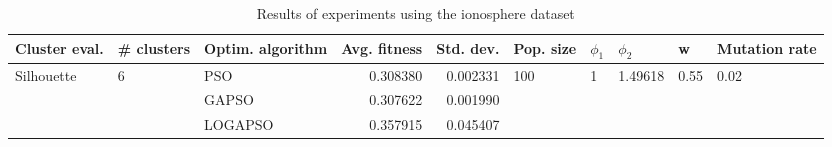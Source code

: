 \begin{table}
\centering
\caption{Results of experiments using the ionosphere dataset}
\begin{tabular}{lllrrlllll}
\toprule
              Cluster eval. &        \# clusters & Optim. algorithm &  Avg. fitness &  Std. dev. &            Pop. size &         $\phi_{1}$ &               $\phi_{2}$ &                     w &         Mutation rate \\
\midrule
\multirow{3}{*}{Silhouette} & \multirow{3}{*}{6} &              PSO &      0.308380 &   0.002331 & \multirow{3}{*}{100} & \multirow{3}{*}{1} & \multirow{3}{*}{1.49618} & \multirow{3}{*}{0.55} & \multirow{3}{*}{0.02} \\
                            &                    &            GAPSO &      0.307622 &   0.001990 &                      &                    &                          &                       &                       \\
                            &                    &          LOGAPSO &      0.357915 &   0.045407 &                      &                    &                          &                       &                       \\
\bottomrule
\end{tabular}
\end{table}
